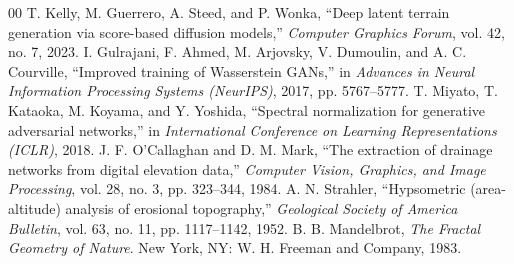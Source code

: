 \documentclass[conference]{IEEEtran}
\begin{document}
\begin{thebibliography}{00}
 T. Kelly, M. Guerrero, A. Steed, and P. Wonka, ``Deep latent terrain generation via score-based diffusion models,'' \textit{Computer Graphics Forum}, vol. 42, no. 7, 2023.
 I. Gulrajani, F. Ahmed, M. Arjovsky, V. Dumoulin, and A. C. Courville, ``Improved training of Wasserstein GANs,'' in \textit{Advances in Neural Information Processing Systems (NeurIPS)}, 2017, pp. 5767--5777.
 T. Miyato, T. Kataoka, M. Koyama, and Y. Yoshida, ``Spectral normalization for generative adversarial networks,'' in \textit{International Conference on Learning Representations (ICLR)}, 2018.
 J. F. O'Callaghan and D. M. Mark, ``The extraction of drainage networks from digital elevation data,'' \textit{Computer Vision, Graphics, and Image Processing}, vol. 28, no. 3, pp. 323--344, 1984.
 A. N. Strahler, ``Hypsometric (area-altitude) analysis of erosional topography,'' \textit{Geological Society of America Bulletin}, vol. 63, no. 11, pp. 1117--1142, 1952.
 B. B. Mandelbrot, \textit{The Fractal Geometry of Nature}. New York, NY: W. H. Freeman and Company, 1983.
\end{thebibliography}
\end{document}
